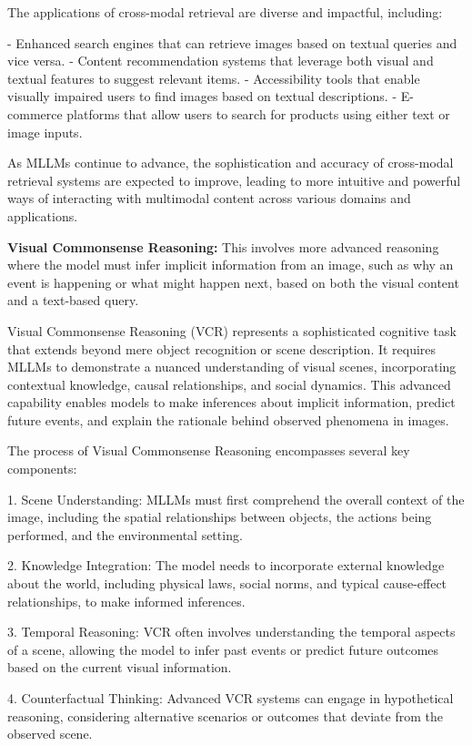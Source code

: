 The applications of cross-modal retrieval are diverse and impactful, including:

- Enhanced search engines that can retrieve images based on textual queries and vice versa.
- Content recommendation systems that leverage both visual and textual features to suggest relevant items.
- Accessibility tools that enable visually impaired users to find images based on textual descriptions.
- E-commerce platforms that allow users to search for products using either text or image inputs.

As MLLMs continue to advance, the sophistication and accuracy of cross-modal retrieval systems are expected to improve, leading to more intuitive and powerful ways of interacting with multimodal content across various domains and applications.


\textbf{Visual Commonsense Reasoning:} This involves more advanced reasoning where the model must infer implicit information from an image, such as why an event is happening or what might happen next, based on both the visual content and a text-based query.

Visual Commonsense Reasoning (VCR) represents a sophisticated cognitive task that extends beyond mere object recognition or scene description. It requires MLLMs to demonstrate a nuanced understanding of visual scenes, incorporating contextual knowledge, causal relationships, and social dynamics. This advanced capability enables models to make inferences about implicit information, predict future events, and explain the rationale behind observed phenomena in images.

The process of Visual Commonsense Reasoning encompasses several key components:

1. Scene Understanding: MLLMs must first comprehend the overall context of the image, including the spatial relationships between objects, the actions being performed, and the environmental setting.

2. Knowledge Integration: The model needs to incorporate external knowledge about the world, including physical laws, social norms, and typical cause-effect relationships, to make informed inferences.

3. Temporal Reasoning: VCR often involves understanding the temporal aspects of a scene, allowing the model to infer past events or predict future outcomes based on the current visual information.

4. Counterfactual Thinking: Advanced VCR systems can engage in hypothetical reasoning, considering alternative scenarios or outcomes that deviate from the observed scene.

